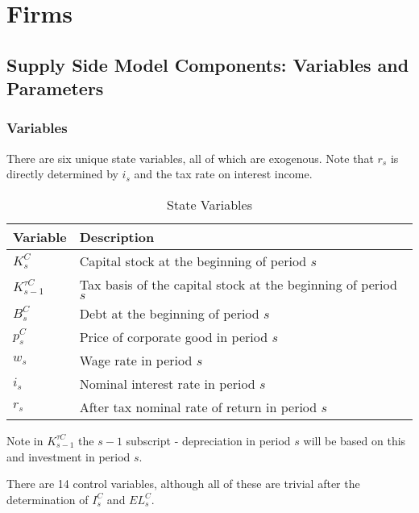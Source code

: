 \chapter{Firms}
%



 \section{Supply Side Model Components: Variables and Parameters}
\label{sec:components}

\subsection{Variables}

There are six unique state variables, all of which are exogenous.  Note that $r_{s}$ is directly determined by $i_{s}$ and the tax rate on interest income.

\begin{table}[htbp]
  \centering
  \caption{State Variables}
    \begin{tabular}{ll}
    \hline
    \hline
    Variable & Description \\
    \hline
    $K^{C}_{s}$ & Capital stock at the beginning of period $s$ \\
    $K^{\tau C}_{s-1}$ & Tax basis of the capital stock at the beginning of period $s$\\
    $B^{C}_{s}$ & Debt at the beginning of period $s$ \\
    $p^{C}_{s}$ & Price of corporate good in period $s$ \\
    $w_{s}$ & Wage rate in period $s$ \\
    $i_{s}$ & Nominal interest rate in period $s$ \\
    $r_{s}$ & After tax nominal rate of return in period $s$ \\
    \hline
    \hline
    \end{tabular}%
  \label{tab:state_vars}%
\end{table}%

Note in $K^{\tau C}_{s-1}$ the $s-1$ subscript - depreciation in period $s$ will be based on this and investment in period $s$.

There are 14 control variables, although all of these are trivial after the determination of $I^{C}_{s}$ and $EL^{C}_{s}$.

